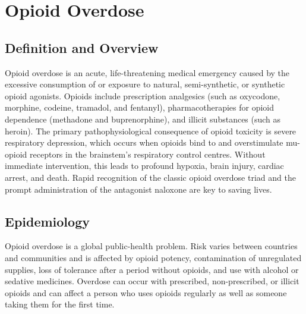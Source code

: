 \chapter{Opioid Overdose}

\section*{Definition and Overview}
Opioid overdose is an acute, life-threatening medical emergency caused by the excessive consumption of or exposure to natural, semi-synthetic, or synthetic opioid agonists. Opioids include prescription analgesics (such as oxycodone, morphine, codeine, tramadol, and fentanyl), pharmacotherapies for opioid dependence (methadone and buprenorphine), and illicit substances (such as heroin). The primary pathophysiological consequence of opioid toxicity is severe respiratory depression, which occurs when opioids bind to and overstimulate mu-opioid receptors in the brainstem's respiratory control centres. Without immediate intervention, this leads to profound hypoxia, brain injury, cardiac arrest, and death. Rapid recognition of the classic opioid overdose triad and the prompt administration of the antagonist naloxone are key to saving lives.

\section*{Epidemiology}
Opioid overdose is a global public-health problem. Risk varies between countries and communities and is affected by opioid potency, contamination of unregulated supplies, loss of tolerance after a period without opioids, and use with alcohol or sedative medicines. Overdose can occur with prescribed, non-prescribed, or illicit opioids and can affect a person who uses opioids regularly as well as someone taking them for the first time.

